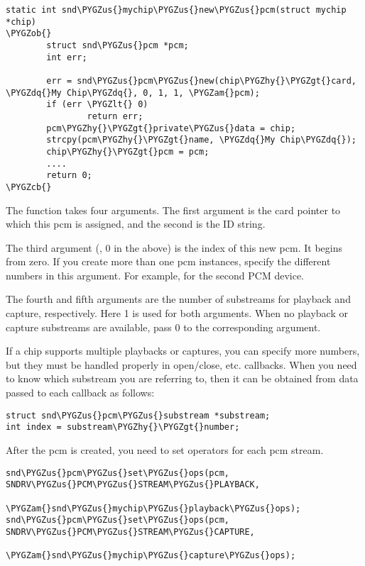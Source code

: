 \documentclass[a4paper,8pt,english]{sphinxmanual}
\def\PYGZus{\char`\_}
\def\PYGZob{\char`\{}
\def\PYGZcb{\char`\}}
\def\PYGZam{\char`\&}
\def\PYGZlt{\char`\<}
\def\PYGZgt{\char`\>}
\def\PYGZhy{\char`\-}
\def\PYGZdq{\char`\"}
\begin{document}
\begin{Verbatim}[commandchars=\\\{\}]
static int snd\PYGZus{}mychip\PYGZus{}new\PYGZus{}pcm(struct mychip *chip)
\PYGZob{}
        struct snd\PYGZus{}pcm *pcm;
        int err;

        err = snd\PYGZus{}pcm\PYGZus{}new(chip\PYGZhy{}\PYGZgt{}card, \PYGZdq{}My Chip\PYGZdq{}, 0, 1, 1, \PYGZam{}pcm);
        if (err \PYGZlt{} 0)
                return err;
        pcm\PYGZhy{}\PYGZgt{}private\PYGZus{}data = chip;
        strcpy(pcm\PYGZhy{}\PYGZgt{}name, \PYGZdq{}My Chip\PYGZdq{});
        chip\PYGZhy{}\PYGZgt{}pcm = pcm;
        ....
        return 0;
\PYGZcb{}
\end{Verbatim}

The  function takes four arguments. The
first argument is the card pointer to which this pcm is assigned, and
the second is the ID string.

The third argument (, 0 in the above) is the index of this new
pcm. It begins from zero. If you create more than one pcm instances,
specify the different numbers in this argument. For example,  for the second PCM device.

The fourth and fifth arguments are the number of substreams for playback
and capture, respectively. Here 1 is used for both arguments. When no
playback or capture substreams are available, pass 0 to the
corresponding argument.

If a chip supports multiple playbacks or captures, you can specify more
numbers, but they must be handled properly in open/close, etc.
callbacks. When you need to know which substream you are referring to,
then it can be obtained from  data passed to each callback as follows:

\begin{Verbatim}[commandchars=\\\{\}]
struct snd\PYGZus{}pcm\PYGZus{}substream *substream;
int index = substream\PYGZhy{}\PYGZgt{}number;
\end{Verbatim}

After the pcm is created, you need to set operators for each pcm stream.

\begin{Verbatim}[commandchars=\\\{\}]
snd\PYGZus{}pcm\PYGZus{}set\PYGZus{}ops(pcm, SNDRV\PYGZus{}PCM\PYGZus{}STREAM\PYGZus{}PLAYBACK,
                \PYGZam{}snd\PYGZus{}mychip\PYGZus{}playback\PYGZus{}ops);
snd\PYGZus{}pcm\PYGZus{}set\PYGZus{}ops(pcm, SNDRV\PYGZus{}PCM\PYGZus{}STREAM\PYGZus{}CAPTURE,
                \PYGZam{}snd\PYGZus{}mychip\PYGZus{}capture\PYGZus{}ops);
\end{Verbatim}
\end{document}
